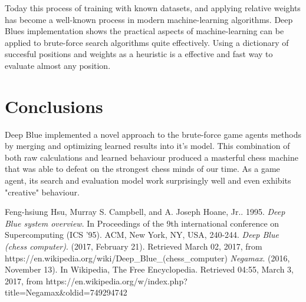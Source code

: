 \documentclass[paper=letter, fontsize=12pt]{article}
\begin{document}
Today this process of training with known datasets, and applying relative weights has become a well-known process in modern machine-learning algorithms. Deep Blues implementation shows the practical aspects of machine-learning can be applied to brute-force search algorithms quite effectively. Using a dictionary of succesful positions and weights as a heuristic is a effective and fast way to evaluate almost any position.

\section{Conclusions}

Deep Blue implemented a novel approach to the brute-force game agents methods by merging and optimizing learned results into it's model. This combination of both raw calculations and learned behaviour produced a masterful chess machine that was able to defeat on the strongest chess minds of our time. As a game agent, its search and evaluation model work surprisingly well and even exhibits "creative" behaviour.


\begin{thebibliography}{99}
Feng-hsiung Hsu, Murray S. Campbell, and A. Joseph Hoane, Jr.. 1995. \textit{Deep Blue system overview}. In Proceedings of the 9th international conference on Supercomputing (ICS '95). ACM, New York, NY, USA, 240-244.
\textit{Deep Blue (chess computer)}. (2017, February 21). Retrieved March 02, 2017, from https://en.wikipedia.org/wiki/Deep_Blue_(chess_computer)
\textit{Negamax}. (2016, November 13). In Wikipedia, The Free Encyclopedia. Retrieved 04:55, March 3, 2017, from https://en.wikipedia.org/w/index.php?title=Negamax&oldid=749294742

\end{thebibliography}

\end{document}
